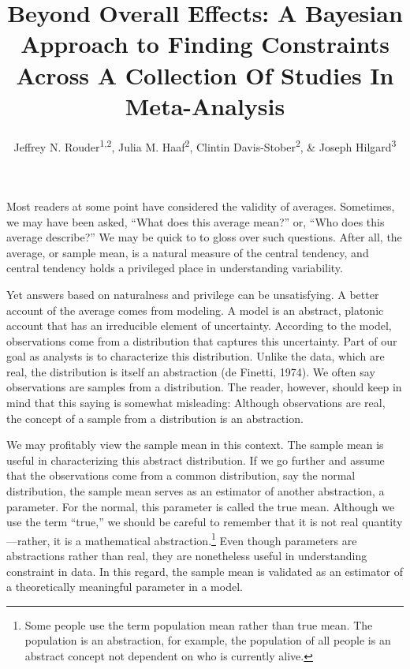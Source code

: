 \documentclass[english,man]{apa6}
\title{Beyond Overall Effects: A Bayesian Approach to Finding Constraints
Across A Collection Of Studies In Meta-Analysis}
\author{Jeffrey N. Rouder\textsuperscript{1,2}, Julia M. Haaf\textsuperscript{2}, Clintin Davis-Stober\textsuperscript{2}, \& Joseph Hilgard\textsuperscript{3}}
\affiliation{
    \vspace{0.5cm}
          \textsuperscript{1} University of California, Irvine\\
          \textsuperscript{2} University of Missouri\\
          \textsuperscript{3} Illinois State University  }
\theoremstyle{definition}
\theoremstyle{definition}
\theoremstyle{remark}
\begin{document}
\maketitle

\setcounter{secnumdepth}{0}



Most readers at some point have considered the validity of averages.
Sometimes, we may have been asked, \enquote{What does this average
mean?} or, \enquote{Who does this average describe?} We may be quick to
to gloss over such questions. After all, the average, or sample mean, is
a natural measure of the central tendency, and central tendency holds a
privileged place in understanding variability.

Yet answers based on naturalness and privilege can be unsatisfying. A
better account of the average comes from modeling. A model is an
abstract, platonic account that has an irreducible element of
uncertainty. According to the model, observations come from a
distribution that captures this uncertainty. Part of our goal as
analysts is to characterize this distribution. Unlike the data, which
are real, the distribution is itself an abstraction (de Finetti, 1974).
We often say observations are samples from a distribution. The reader,
however, should keep in mind that this saying is somewhat misleading:
Although observations are real, the concept of a sample from a
distribution is an abstraction.

We may profitably view the sample mean in this context. The sample mean
is useful in characterizing this abstract distribution. If we go further
and assume that the observations come from a common distribution, say
the normal distribution, the sample mean serves as an estimator of
another abstraction, a parameter. For the normal, this parameter is
called the true mean. Although we use the term \enquote{true,} we should
be careful to remember that it is not real quantity---rather, it is a
mathematical abstraction.\footnote{Some people use the term population
  mean rather than true mean. The population is an abstraction, for
  example, the population of all people is an abstract concept not
  dependent on who is currently alive.} Even though parameters are
abstractions rather than real, they are nonetheless useful in
understanding constraint in data. In this regard, the sample mean is
validated as an estimator of a theoretically meaningful parameter in a
model.
\end{document}
